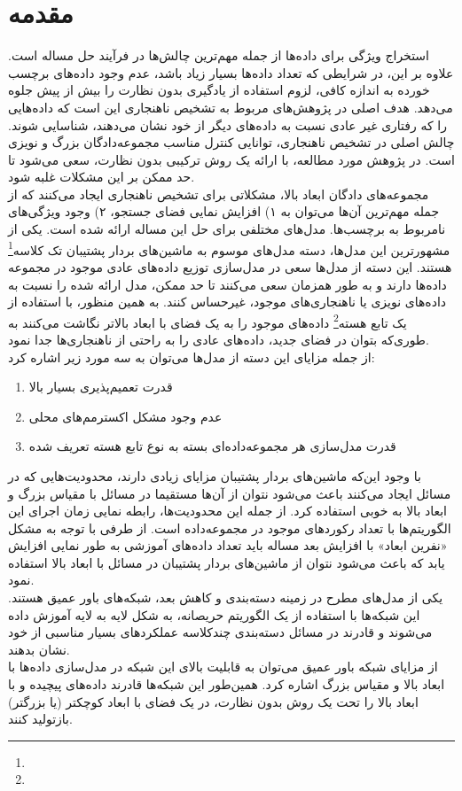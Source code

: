 \documentclass[twocolumn]{article}
\newcommand{\enfootnote}[1]{\footnote{\lr{#1}}}
\begin{document}
\section{مقدمه}
استخراج ویژگی‌ برای داده‌ها از جمله مهم‌ترین چالش‌ها در فرآیند حل مساله است. علاوه بر این، در شرایطی که تعداد داده‌ها بسیار زیاد باشد، عدم وجود داده‌های برچسب خورده به اندازه کافی، لزوم استفاده از یادگیری بدون نظارت را بیش از پیش جلوه می‌دهد. هدف اصلی در پژوهش‌های مربوط به تشخیص ناهنجاری این است که داده‌هایی را که رفتاری غیر عادی نسبت به داده‌های دیگر از خود نشان می‌دهند، شناسایی شوند. چالش اصلی در تشخیص ناهنجاری، توانایی کنترل مناسب مجموعه‌دادگان بزرگ و نویزی است. در پژوهش مورد مطالعه، با ارائه یک روش ترکیبی بدون نظارت، سعی می‌شود تا حد ممکن بر این مشکلات غلبه شود.
\\
مجموعه‌های دادگان ابعاد بالا، مشکلاتی برای تشخیص ناهنجاری ایجاد می‌کنند که از جمله مهم‌ترین آن‌ها می‌توان به ۱) افزایش نمایی فضای جستجو، ۲) وجود ویژگی‌های نامربوط به برچسب‌ها. مدل‌های مختلفی برای حل این مساله ارائه شده است. یکی از مشهورترین این مدل‌ها، دسته مدل‌های موسوم به ماشین‌های بردار پشتیبان تک کلاسه\enfootnote{One Class SVMs} هستند. این دسته از مدل‌ها سعی در مدل‌سازی توزیع داده‌های عادی موجود در مجموعه داده‌ها دارند و به طور همزمان سعی می‌کنند تا حد ممکن، مدل ارائه شده را نسبت به داده‌های نویزی یا ناهنجاری‌های موجود، غیرحساس کنند. به همین منظور، با استفاده از یک تابع هسته\enfootnote{Kernel Function} داده‌های موجود را به یک فضای با ابعاد بالاتر نگاشت می‌کنند به طوری‌که بتوان در فضای جدید، داده‌های عادی را به راحتی از ناهنجاری‌ها جدا نمود. 
\\
از جمله مزایای این دسته از مدل‌ها می‌توان به سه مورد زیر اشاره کرد:
\begin{enumerate}
\item قدرت تعمیم‌پذیری بسیار بالا
\item عدم وجود مشکل اکسترمم‌های محلی
\item قدرت مدل‌سازی هر مجموعه‌داده‌ای بسته به نوع تابع هسته تعریف شده
\end{enumerate}
با وجود این‌که ماشین‌های بردار پشتیبان مزایای زیادی دارند، محدودیت‌هایی که در مسائل ایجاد می‌کنند باعث می‌شود نتوان از آن‌ها مستقیما در مسائل با مقیاس بزرگ و ابعاد بالا به خوبی استفاده کرد. از جمله این محدودیت‌ها، رابطه نمایی زمان اجرای این الگوریتم‌ها با تعداد رکوردهای موجود در مجموعه‌داده است. از طرفی با توجه به مشکل «نفرین ابعاد» با افزایش بعد مساله باید تعداد داده‌های آموزشی به طور نمایی افزایش یابد که باعث می‌شود نتوان از ماشین‌های بردار پشتیبان در مسائل با ابعاد بالا استفاده نمود.
\\
یکی از مدل‌های مطرح در زمینه دسته‌بندی و کاهش بعد، شبکه‌های باور عمیق هستند. این شبکه‌ها با استفاده از یک الگوریتم حریصانه، به شکل لایه به لایه آموزش داده‌ می‌شوند و قادرند در مسائل دسته‌بندی چندکلاسه عملکردهای بسیار مناسبی از خود نشان بدهند. 
\\
از مزایای شبکه باور عمیق می‌توان به قابلیت بالای این شبکه در مدل‌سازی داده‌ها با ابعاد بالا و مقیاس بزرگ اشاره کرد. همین‌طور این شبکه‌ها قادرند داده‌های پیچیده و با ابعاد بالا را تحت یک روش بدون نظارت، در یک فضای با ابعاد کوچکتر (یا بزرگتر) بازتولید کنند.
\end{document}
